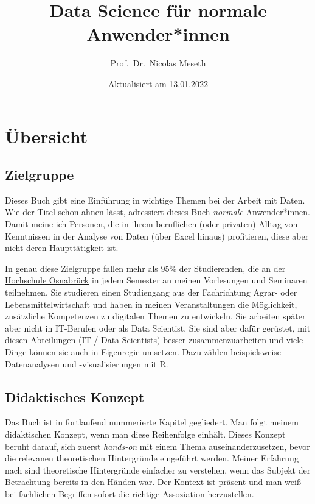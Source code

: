 \documentclass[
]{book}
\title{Data Science für normale Anwender*innen}
\author{Prof.~Dr.~Nicolas Meseth}
\date{Aktualisiert am 13.01.2022}
\begin{document}
\maketitle

{
\setcounter{tocdepth}{1}
\tableofcontents
}
\hypertarget{uxfcbersicht}{%
\chapter*{Übersicht}\label{uxfcbersicht}}

\hypertarget{zielgruppe}{%
\section*{Zielgruppe}\label{zielgruppe}}

Dieses Buch gibt eine Einführung in wichtige Themen bei der Arbeit mit Daten. Wie der Titel schon ahnen lässt, adressiert dieses Buch \emph{normale} Anwender*innen. Damit meine ich Personen, die in ihrem beruflichen (oder privaten) Alltag von Kenntnissen in der Analyse von Daten (über Excel hinaus) profitieren, diese aber nicht deren Haupttätigkeit ist.

In genau diese Zielgruppe fallen mehr als 95\% der Studierenden, die an der \href{https://hs-osnabrueck.de}{Hochschule Osnabrück} in jedem Semester an meinen Vorlesungen und Seminaren teilnehmen. Sie studieren einen Studiengang aus der Fachrichtung Agrar- oder Lebensmittelwirtschaft und haben in meinen Veranstaltungen die Möglichkeit, zusätzliche Kompetenzen zu digitalen Themen zu entwickeln. Sie arbeiten später aber nicht in IT-Berufen oder als Data Scientist. Sie sind aber dafür gerüstet, mit diesen Abteilungen (IT / Data Scientists) besser zusammenzuarbeiten und viele Dinge können sie auch in Eigenregie umsetzen. Dazu zählen beispielsweise Datenanalysen und -visualisierungen mit R.

\hypertarget{didaktisches-konzept}{%
\section*{Didaktisches Konzept}\label{didaktisches-konzept}}

Das Buch ist in fortlaufend nummerierte Kapitel gegliedert. Man folgt meinem didaktischen Konzept, wenn man diese Reihenfolge einhält. Dieses Konzept beruht darauf, sich zuerst \emph{hands-on} mit einem Thema auseinanderzusetzen, bevor die relevanen theoretischen Hintergründe eingeführt werden. Meiner Erfahrung nach sind theoretische Hintergründe einfacher zu verstehen, wenn das Subjekt der Betrachtung bereits in den Händen war. Der Kontext ist präsent und man weiß bei fachlichen Begriffen sofort die richtige Assoziation herzustellen.
\end{document}
